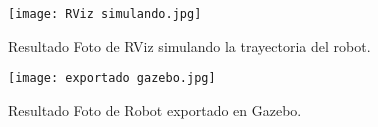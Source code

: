 \begin{figure}[H]
	\centering
	\texttt{[image: RViz simulando.jpg]}
	\caption{Resultado Foto de RViz simulando la trayectoria del robot.}
	\label{fig:RViz simulando}
\end{figure}

\begin{figure}[H]
	\centering
	\texttt{[image: exportado gazebo.jpg]}
	\caption{Resultado Foto de Robot exportado en Gazebo.}
	\label{fig:Robot Exportado}
\end{figure}
